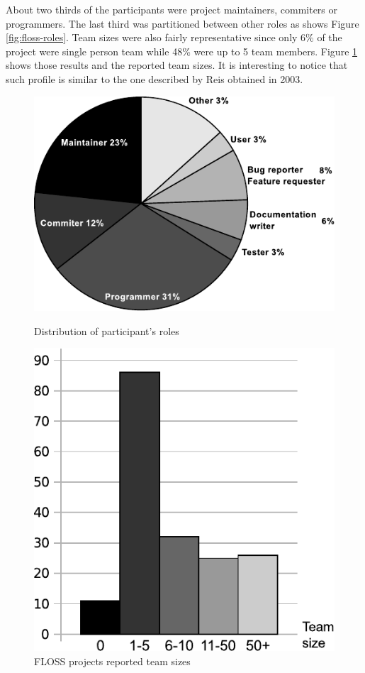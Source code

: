 \documentclass[lnbip]{svmultln}
\begin{document}
About two thirds of the participants were project maintainers,
commiters or programmers. The last third was partitioned between other
roles as shows Figure \ref{fig:floss-roles}. Team sizes were also
fairly representative since only 6\% of the project were single person
team while 48\% were up to 5 team members. Figure
\ref{fig:floss-teams} shows those results and the reported team
sizes. It is interesting to notice that such profile is similar to the
one described by Reis \cite{reis2003} obtained in 2003.

\begin{figure}[htb]
  \begin{minipage}[t]{0.5\linewidth}
    \includegraphics[scale=0.8]{floss-roles.pdf}
    \caption{Distribution of participant's roles}
    \label{fig:floss-roles}
  \end{minipage}
  \begin{minipage}[t]{0.5\linewidth}
    \begin{flushright}
      \includegraphics[scale=0.65]{floss-teams.pdf}
      \caption{FLOSS projects reported team sizes}
      \label{fig:floss-teams}
    \end{flushright}
  \end{minipage}
\end{figure}
\end{document}

